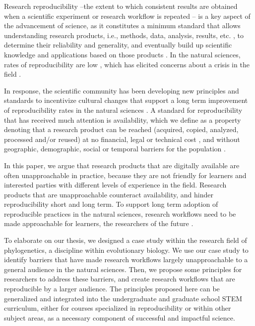 \documentclass[12pt]{article}
\begin{document}
Research reproducibility --the extent to which consistent results are obtained when
a scientific experiment or research workflow is repeated \citep{repdef2021}-- is a key aspect of the advancement of science, as it constitutes a minimum standard that allows understanding research products, i.e., methods, data, analysis, results, etc. \citep{piwowar2013value}, to determine their reliability and generality, and eventually build up scientific knowledge and applications based on those products \citep{king1995replication, peng2011reproducible, powers2019open}.
In the natural sciences, rates of reproducibility are low \citep{ioannidis2005most, prinz2011believe}, which has elicited concerns about a crisis in the field \citep{baker2016reproducibility}.

In response, the scientific community has been developing new principles and standards to incentivize cultural changes that support a long term improvement of reproducibility rates in the natural sciences \citep{peng2015reproducibility, wilkinson2016fair, miyakawa2020no}.
A standard for reproducibility that has received much attention is availability, which we define as a property denoting that a research product can be reached (acquired, copied, analyzed, processed and/or reused) at no financial, legal or technical cost \citep{arnold2019turing}, and without geographic, demographic, social or temporal barriers for the population \citep{fecher2014open}.

In this paper, we argue that research products that are digitally available are often unapproachable in practice, because they are not friendly for learners and interested parties with different levels of experience in the field. 
Research products that are unapproachable counteract availability, and hinder reproducibility short and long term.
To support long term adoption of reproducible practices in the natural sciences, research workflows need to be made approachable for learners, the researchers of the future \citep{roland2002think}.

To elaborate on our thesis, we designed a case study within the research field of phylogenetics, a discipline within evolutionary biology.
We use our case study to identify barriers that have made research workflows largely unapproachable to a general audience in the natural sciences.
Then, we propose some principles for researchers to address these barriers, and create research workflows that are reproducible by a larger audience.
The principles proposed here can be generalized and integrated into the undergraduate and graduate school STEM curriculum, either for courses specialized in reproducibility or within other subject areas, as a necessary component of successful and impactful science.
\end{document}
